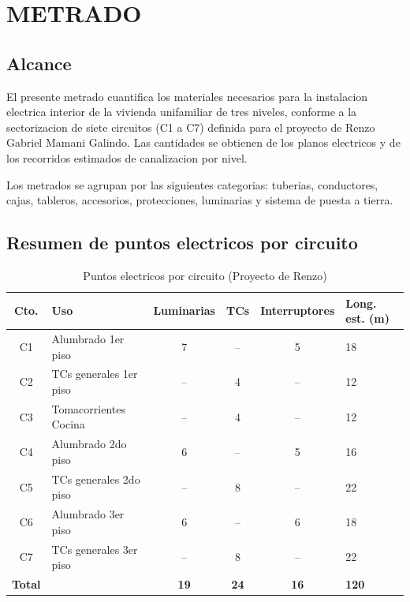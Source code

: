 \chapter{METRADO}

\section{Alcance}

El presente metrado cuantifica los materiales necesarios para la instalacion electrica interior de la vivienda unifamiliar de tres niveles, conforme a la sectorizacion de siete circuitos (C1 a C7) definida para el proyecto de Renzo Gabriel Mamani Galindo. Las cantidades se obtienen de los planos electricos y de los recorridos estimados de canalizacion por nivel.

Los metrados se agrupan por las siguientes categorias: tuberias, conductores, cajas, tableros, accesorios, protecciones, luminarias y sistema de puesta a tierra.

\section{Resumen de puntos electricos por circuito}

\begin{table}[H]
\centering
\small
\caption{Puntos electricos por circuito (Proyecto de Renzo)}
\label{tab:puntos-por-circuito}
\begin{tabularx}{\textwidth}{c L{4.5cm} c c c Y}
\toprule
\textbf{Cto.} & \textbf{Uso} & \textbf{Luminarias} & \textbf{TCs} & \textbf{Interruptores} & \textbf{Long. est. (m)} \\
\midrule
C1 & Alumbrado 1er piso & 7 & -- & 5 & 18 \\
C2 & TCs generales 1er piso & -- & 4 & -- & 12 \\
C3 & Tomacorrientes Cocina & -- & 4 & -- & 12 \\
C4 & Alumbrado 2do piso & 6 & -- & 5 & 16 \\
C5 & TCs generales 2do piso & -- & 8 & -- & 22 \\
C6 & Alumbrado 3er piso & 6 & -- & 6 & 18 \\
C7 & TCs generales 3er piso & -- & 8 & -- & 22 \\
\midrule
\textbf{Total} & & \textbf{19} & \textbf{24} & \textbf{16} & \textbf{120} \\
\bottomrule
\end{tabularx}
\end{table}

